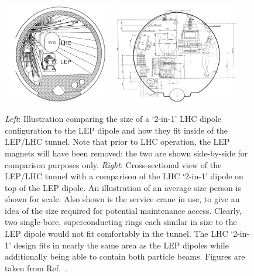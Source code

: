 \begin{figure}[!htb]
    \begin{center}
        \includegraphics[width=0.43\textwidth]{figures/chapter2/lhc_lep_dipole_comp}
        \includegraphics[width=0.50\textwidth]{figures/chapter2/lhc_lep_dipole_comp_person}
        \caption{
            \textit{Left}: Illustration comparing the size of a `2-in-1' LHC dipole configuration to the
                LEP dipole and how they fit inside of the LEP/LHC tunnel. Note that prior to LHC operation,
                the LEP magnets will have been removed: the two are shown side-by-side for comparison purposes only.
            \textit{Right}: Cross-sectional view of the LEP/LHC tunnel with a comparison of the LHC `2-in-1' dipole
                on top of the LEP dipole. An illustration of an average size person is shown
                for scale. Also shown is the service crane in use, to give an idea of the size required
                for potential maintenance access. Clearly, two single-bore, superconducting rings each similar in size
                to the LEP dipole would not fit comfortably in the tunnel. The LHC `2-in-1' design fits
                in nearly the same area as the LEP dipoles while additionally being able to contain both
                particle beams.
                Figures are taken from Ref.~\cite{ECFALHCinLEP}.
        }
        \label{fig:lhc_lep_dipole_comp}
    \end{center}
\end{figure}


